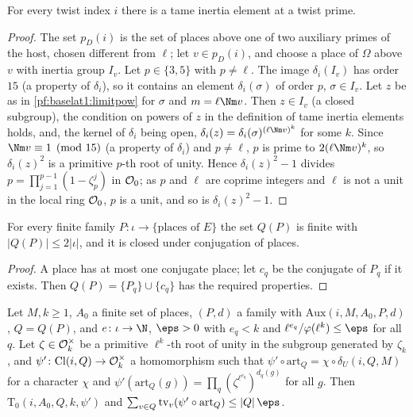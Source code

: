 \begin{lemma}\label{pf:baselat1:tame}
For every twist index $i$ there is a tame inertia element at a twist prime.
\end{lemma}

\begin{proof}
The set $p_D(i)$ is the set of places above one of two auxiliary primes of the host, chosen different from $\ell$;
let $v\in p_D(i)$, and choose a place of $\Omega$ above $v$ with inertia group $I_v$. Let $p\in\{3,5\}$ with
$p\ne\ell$. The image $\delta_i(I_v)$ has order $15$ (a property of $\delta_i$), so it contains an element
$\delta_i(\sigma)$ of order $p$, $\sigma\in I_v$. Let $z$ be as in \cref{pf:baselat1:limitpow} for $\sigma$ and
$m=\ell\Nm v$. Then $z\in I_v$ (a closed subgroup), the condition on powers of $z$ in the definition of tame inertia
elements holds, and, the kernel of $\delta_i$ being open, $\delta_i(z)=\delta_i(\sigma)^{(\ell\Nm v)^{k}}$ for some
$k$. Since $\Nm v\equiv1\pmod{15}$ (a property of $\delta_i$) and $p\ne\ell$, $p$ is prime to $2(\ell\Nm v)^k$, so
$\delta_i(z)^2$ is a primitive $p$-th root of unity. Hence $\delta_i(z)^2-1$ divides $p=\prod_{j=1}^{p-1}(1-\zeta_p^j)$ in
$\mathcal O_0$; as $p$ and $\ell$ are coprime integers and $\ell$ is not a unit in the local ring $\mathcal O_0$,
$p$ is a unit, and so is $\delta_i(z)^2-1$.
\end{proof}

\begin{lemma}\label{pf:baselat1:isQ}
For every finite family $P\colon\iota\to\{\text{places of }E\}$ the set $Q(P)$ is finite with
$|Q(P)|\le2|\iota|$, and it is closed under conjugation of places.
\end{lemma}

\begin{proof}
A place has at most one conjugate place; let $c_q$ be the conjugate of $P_q$ if it exists. Then
$Q(P)=\{P_q\}\cup\{c_q\}$ has the required properties.
\end{proof}

\begin{lemma}\label{pf:baselat1:psiok}
Let $M,k\ge1$, $A_0$ a finite set of places, $(P,d)$ a family with $\mathrm{Aux}(i,M,A_0,P,d)$, $Q=Q(P)$,
and $e\colon\iota\to\N$, $\eps>0$ with $e_q<k$ and $\ell^{e_q}/\varphi(\ell^k)\le\eps$ for all $q$.
Let $\zeta\in\mathcal O_k^\times$ be a primitive $\ell^k$-th root of unity in the subgroup generated by $\zeta_k$, and
$\psi'\colon\mathrm{Cl}(i,Q)\to\mathcal O_k^\times$ a homomorphism such that
$\psi'\circ\mathrm{art}_Q=\chi\circ\delta_U(i,Q,M)$ for a character $\chi$ and
$\psi'(\mathrm{art}_Q(g))=\prod_q(\zeta^{\ell^{e_q}})^{d_q(g)}$ for all $g$. Then $\mathrm{T}_0(i,A_0,Q,k,\psi')$ and
$\sum_{v\in Q}\mathrm{tv}_v(\psi'\circ\mathrm{art}_Q)\le|Q|\,\eps$.
\end{lemma}

